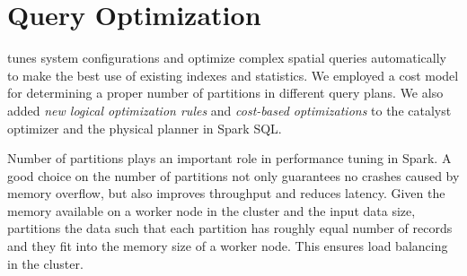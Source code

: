 \section{Query Optimization}
\label{sec:opt}
\name tunes system configurations and optimize complex spatial queries
automatically to make the best use of existing indexes and
statistics. We employed a cost model for determining a proper number
of partitions in different query plans. We also added {\em new logical
  optimization rules} and {\em cost-based optimizations} to the
catalyst optimizer and the physical planner in Spark SQL.

Number of partitions plays an important role in performance tuning in
Spark.  A good choice on the number of partitions not only guarantees
no crashes caused by memory overflow, but also improves throughput and
reduces latency. Given the memory available on a worker node in the
cluster and the input data size, \name partitions the data such that
each partition has roughly equal number of records and they fit into
the memory size of a worker node. This ensures load balancing in the
cluster.


